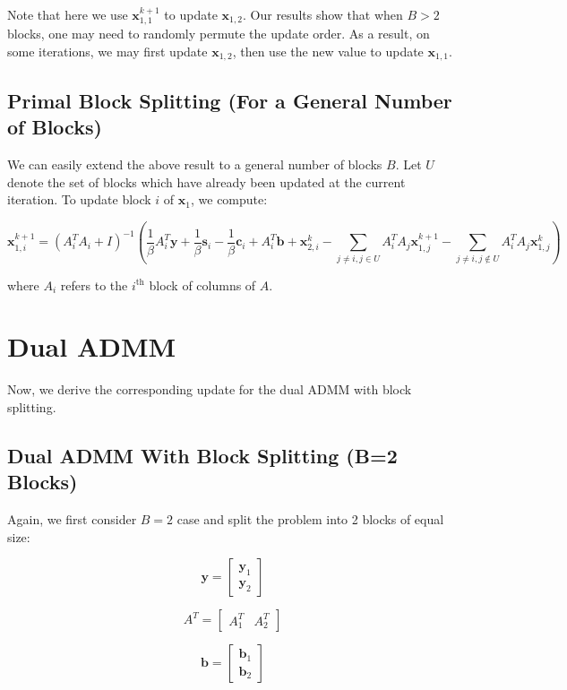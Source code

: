 \documentclass{article}
\begin{document}
Note that here we use $\mathbf{x}_{1,1}^{k+1}$ to update $\mathbf{x}_{1,2}$. Our results show that when $B>2$ blocks, one may need to randomly permute the update order. As a result, on some iterations, we may first update $\mathbf{x}_{1,2}$, then use the new value to update $\mathbf{x}_{1,1}$. 

\subsection*{Primal Block Splitting (For a General Number of Blocks)}

We can easily extend the above result to a general number of blocks $B$. Let $U$ denote the set of blocks which have already been updated at the current iteration. To update block $i$ of $\mathbf{x}_{1}$, we compute:

\[
\mathbf{x}_{1,i}^{k+1}=\left(A_{i}^{T}A_{i}+I\right)^{-1}\left(\frac{1}{\beta}A_{i}^{T}\mathbf{y}+\frac{1}{\beta}\mathbf{s}_{i}-\frac{1}{\beta}\mathbf{c}_{i}+A_{i}^{T}\mathbf{b}+\mathbf{x}_{2,i}^{k}-\sum_{j\neq i,j\in U}A_{i}^{T}A_{j}\mathbf{x}_{1,j}^{k+1}-\sum_{j\neq i,j\notin U}A_{i}^{T}A_{j}\mathbf{x}_{1,j}^{k}\right)
\]

where $A_{i}$ refers to the $i^{\text{th}}$ block of columns of $A$.

\vspace{0.5in}
\section*{Dual ADMM }

Now, we derive the corresponding update for the dual ADMM with block splitting.

\subsection*{Dual ADMM With Block Splitting (B=2 Blocks)}

Again, we first consider $B=2$ case and split the problem into 2 blocks of equal size:

\[
\mathbf{y}=\begin{bmatrix}\mathbf{y}_{1}\\
\mathbf{y}_{2}
\end{bmatrix}
\]

\[
A^{T}=\begin{bmatrix}A_{1}^{T} & A_{2}^{T}\end{bmatrix}
\]

\[
\mathbf{b}=\begin{bmatrix}\mathbf{b}_{1}\\
\mathbf{b}_{2}
\end{bmatrix}
\]
\end{document}
